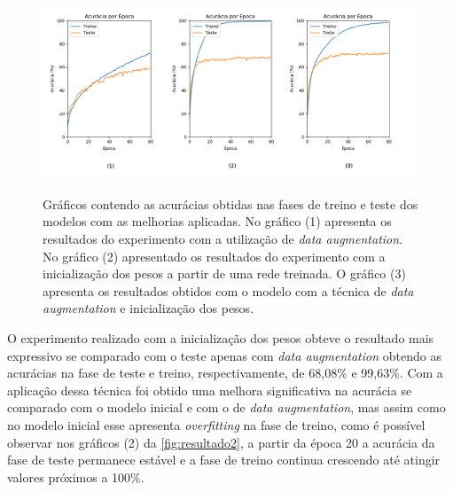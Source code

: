 \begin{figure}[H]
  \centering
  \caption{Gráficos contendo as acurácias obtidas nas fases de treino e teste dos modelos com as melhorias aplicadas. No gráfico (1) apresenta os resultados do experimento com a utilização de \textit{data augmentation}. No gráfico (2) apresentado os resultados do experimento com a inicialização dos pesos a partir de uma rede treinada. O gráfico (3) apresenta os resultados obtidos com o modelo com a técnica de \textit{data augmentation} e inicialização dos pesos.}
  \includegraphics[width=500pt]{dados/figuras/resultado2}
  \label{fig:resultado2}
\end{figure}

\par O experimento realizado com a inicialização dos pesos obteve o resultado mais expressivo se comparado com o teste apenas com \textit{data augmentation} obtendo as acurácias na fase de teste e treino, respectivamente, de 68,08\% e 99,63\%. Com a aplicação dessa técnica foi obtido uma melhora significativa na acurácia se comparado com o modelo inicial e com o de \textit{data augmentation}, mas assim como no modelo inicial esse apresenta \textit{overfitting} na fase de treino, como é possível observar nos gráficos (2) da \autoref{fig:resultado2}, a partir da época 20 a acurácia da fase de teste permanece estável e a fase de treino continua crescendo até atingir valores próximos a 100\%.

